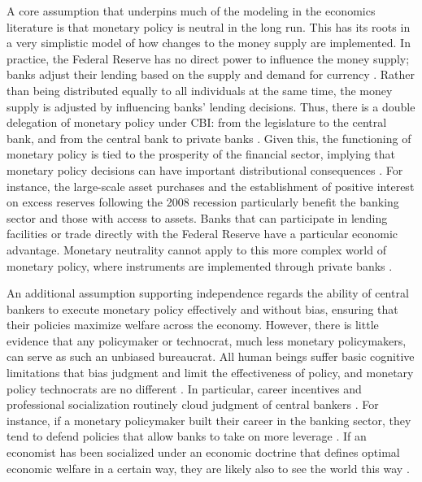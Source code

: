 \documentclass[12pt,a4paper]{article}
\begin{document}
\begin{doublespace}
A core assumption that underpins much of the modeling in the economics literature is that monetary policy is neutral in the long run. This has its roots in a very simplistic model of how changes to the money supply are implemented. In practice, the Federal Reserve has no direct power to influence the money supply; banks adjust their lending based on the supply and demand for currency \parencite{watson_institutional_2002}. Rather than being distributed equally to all individuals at the same time, the money supply is adjusted by influencing banks' lending decisions. Thus, there is a double delegation of monetary policy under CBI: from the legislature to the central bank, and from the central bank to private banks \parencite{downey_our_2025}. Given this, the functioning of monetary policy is tied to the prosperity of the financial sector, implying that monetary policy decisions can have important distributional consequences \parencite{jacobs_fed_2021}. For instance, the large-scale asset purchases and the establishment of positive interest on excess reserves following the 2008 recession particularly benefit the banking sector and those with access to assets. Banks that can participate in lending facilities or trade directly with the Federal Reserve have a particular economic advantage. Monetary neutrality cannot apply to this more complex world of monetary policy, where instruments are implemented through private banks \parencite{downey_our_2025}.


An additional assumption supporting independence regards the ability of central bankers to execute monetary policy effectively and without bias, ensuring that their policies maximize welfare across the economy. However, there is little evidence that any policymaker or technocrat, much less monetary policymakers, can serve as such an unbiased bureaucrat. All human beings suffer basic cognitive limitations that bias judgment and limit the effectiveness of policy, and monetary policy technocrats are no different \parencite{simon_chapter_1997, thaler_nudge_2008}. In particular, career incentives and professional socialization routinely cloud judgment of central bankers \parencite{adolph_bankers_2013}. For instance, if a monetary policymaker built their career in the banking sector, they tend to defend policies that allow banks to take on more leverage \parencite{wirsching_revolving_2018}. If an economist has been socialized under an economic doctrine that defines optimal economic welfare in a certain way, they are likely also to see the world this way \parencite{jacobs_fed_2021}.  


\end{doublespace}
\end{document}
